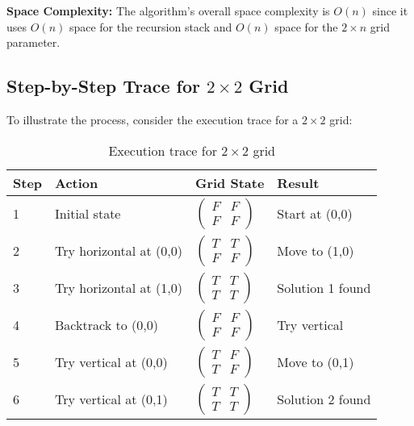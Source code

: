 \documentclass[conference]{IEEEtran}
\begin{document}
\textbf{Space Complexity:} The algorithm's overall space complexity is $O(n)$ since it uses $O(n)$ space for the recursion stack and $O(n)$ space for the $2 \times n$ grid parameter.

\subsection{Step-by-Step Trace for $2 \times 2$ Grid}

To illustrate the process, consider the execution trace for a $2 \times 2$ grid:

\begin{table}[htbp]
\centering
\caption{Execution trace for $2 \times 2$ grid}
\label{tab:trace}
\renewcommand{\arraystretch}{2.0} %
\begin{tabular}{|p{0.7cm}|p{2.2cm}|p{1.8cm}|p{2.0cm}|}
\hline
\textbf{Step} & \textbf{Action} & \textbf{Grid State} & \textbf{Result} \\
\hline
1 & Initial state & $\begin{pmatrix} F & F \\ F & F \end{pmatrix}$ & Start at (0,0) \\
\hline
2 & Try horizontal at (0,0) & $\begin{pmatrix} T & T \\ F & F \end{pmatrix}$ & Move to (1,0) \\
\hline
3 & Try horizontal at (1,0) & $\begin{pmatrix} T & T \\ T & T \end{pmatrix}$ & Solution 1 found \\
\hline
4 & Backtrack to (0,0) & $\begin{pmatrix} F & F \\ F & F \end{pmatrix}$ & Try vertical \\
\hline
5 & Try vertical at (0,0) & $\begin{pmatrix} T & F \\ T & F \end{pmatrix}$ & Move to (0,1) \\
\hline
6 & Try vertical at (0,1) & $\begin{pmatrix} T & T \\ T & T \end{pmatrix}$ & Solution 2 found \\
\hline
\end{tabular}
\end{table}
\end{document}
